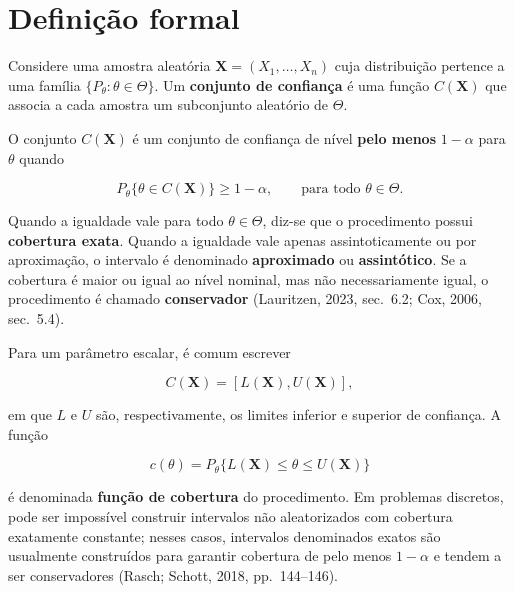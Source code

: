 \documentclass[
  letterpaper,
  DIV=11,
  numbers=noendperiod]{scrreprt}
\begin{document}
\section{Definição formal}\label{definiuxe7uxe3o-formal-3}

Considere uma amostra aleatória \(\mathbf{X}=(X_1,\ldots,X_n)\) cuja
distribuição pertence a uma família \(\{P_\theta:\theta\in\Theta\}\). Um
\textbf{conjunto de confiança} é uma função \(C(\mathbf{X})\) que
associa a cada amostra um subconjunto aleatório de \(\Theta\).

\begin{tcolorbox}[enhanced jigsaw, colback=white, leftrule=.75mm, colbacktitle=quarto-callout-note-color!10!white, breakable, titlerule=0mm, bottomtitle=1mm, title=\textcolor{quarto-callout-note-color}{\faInfo}\hspace{0.5em}{Definição --- conjunto de confiança}, colframe=quarto-callout-note-color-frame, toprule=.15mm, opacityback=0, bottomrule=.15mm, opacitybacktitle=0.6, arc=.35mm, toptitle=1mm, rightrule=.15mm, coltitle=black, left=2mm]

O conjunto \(C(\mathbf{X})\) é um conjunto de confiança de nível
\textbf{pelo menos} \(1-\alpha\) para \(\theta\) quando

\[P_\theta\{\theta\in C(\mathbf{X})\}\geq 1-\alpha,
\qquad \text{para todo }\theta\in\Theta.\]

Quando a igualdade vale para todo \(\theta\in\Theta\), diz-se que o
procedimento possui \textbf{cobertura exata}. Quando a igualdade vale
apenas assintoticamente ou por aproximação, o intervalo é denominado
\textbf{aproximado} ou \textbf{assintótico}. Se a cobertura é maior ou
igual ao nível nominal, mas não necessariamente igual, o procedimento é
chamado \textbf{conservador} (Lauritzen, 2023, sec.~6.2; Cox, 2006,
sec.~5.4).

\end{tcolorbox}

Para um parâmetro escalar, é comum escrever

\[C(\mathbf{X})=[L(\mathbf{X}),U(\mathbf{X})],\]

em que \(L\) e \(U\) são, respectivamente, os limites inferior e
superior de confiança. A função

\[c(\theta)=P_\theta\{L(\mathbf{X})\leq \theta\leq U(\mathbf{X})\}\]

é denominada \textbf{função de cobertura} do procedimento. Em problemas
discretos, pode ser impossível construir intervalos não aleatorizados
com cobertura exatamente constante; nesses casos, intervalos denominados
exatos são usualmente construídos para garantir cobertura de pelo menos
\(1-\alpha\) e tendem a ser conservadores (Rasch; Schott, 2018,
pp.~144--146).
\end{document}
